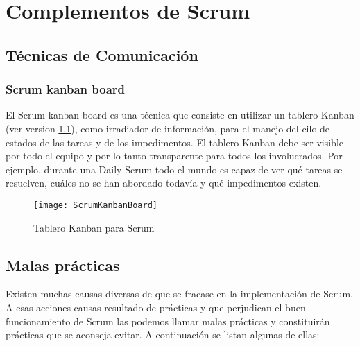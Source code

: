 \chapter{Complementos de Scrum}



\section{Técnicas de Comunicación}

\subsection{Scrum kanban board}

El Scrum kanban board es una técnica que consiste en utilizar un tablero Kanban (ver version \ref{fig:ScrumKanbanBoard}), como irradiador de información, para el manejo del cilo de estados de las tareas y de los impedimentos. El tablero Kanban debe ser visible por todo el equipo y por lo tanto transparente para todos los involucrados. Por ejemplo, durante una Daily Scrum todo el mundo es capaz de ver qué tareas se resuelven, cuáles no se han abordado todavía y qué impedimentos existen.

\begin{figure}[h]
  \centering
  \texttt{[image: ScrumKanbanBoard]}
  \caption{Tablero Kanban para Scrum}
  \centering
  \label{fig:ScrumKanbanBoard} %
\end{figure}


\section{Malas prácticas}

Existen muchas causas diversas de que se fracase en la implementación de Scrum. A esas acciones causas resultado de prácticas y que perjudican el buen funcionamiento de Scrum las podemos llamar malas prácticas y constituirán prácticas que se aconseja evitar.
A continuación se listan algunas de ellas:

